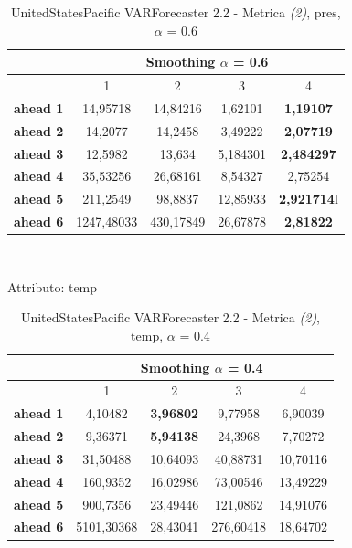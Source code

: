\documentclass[12pt,a4paper,oneside,openright]{book}
\begin{document}
\medskip

\begin{table}[H]
\centering
\begin{tabular}{|c|c|c|c|c|}
\hline
 & \multicolumn{4}{|c|}{Smoothing $\alpha$ = 0.6} \\
\hline
& 1 & 2 & 3 & 4 \\
\hline
\textbf{ahead 1} & 14,95718 & 14,84216 & 1,62101 & \textbf{1,19107} \\
\hline
\textbf{ahead 2} & 14,2077 & 14,2458 & 3,49222 & \textbf{2,07719}\\ 
\hline
\textbf{ahead 3} & 12,5982 & 13,634 & 5,184301 & \textbf{2,484297} \\
\hline
\textbf{ahead 4} & 35,53256 & 26,68161 & 8,54327 & 2,75254\\ 
\hline
\textbf{ahead 5} & 211,2549 & 98,8837 & 12,85933 & \textbf{2,921714}l\\
\hline
\textbf{ahead 6} & 1247,48033 & 430,17849 & 26,67878 & \textbf{2,81822}\\ 
\hline	
\end{tabular} \\
\caption{UnitedStatesPacific VARForecaster 2.2 - Metrica \textit{(2)}, pres, $\alpha$ = 0.6}
\end{table}

\medskip

Attributo: temp \\ 

\begin{table}[H]
\centering
\begin{tabular}{|c|c|c|c|c|}
\hline
 & \multicolumn{4}{|c|}{Smoothing $\alpha$ = 0.4} \\
\hline
& 1 & 2 & 3 & 4 \\
\hline
\textbf{ahead 1} & 4,10482 & \textbf{3,96802} & 9,77958 & 6,90039\\
\hline
\textbf{ahead 2} & 9,36371 & \textbf{5,94138} & 24,3968 & 7,70272\\ 
\hline
\textbf{ahead 3} & 31,50488 & 10,64093 & 40,88731 & 10,70116\\
\hline
\textbf{ahead 4} & 160,9352 & 16,02986 & 73,00546 & 13,49229\\ 
\hline
\textbf{ahead 5} & 900,7356 & 23,49446 & 121,0862 & 14,91076\\
\hline
\textbf{ahead 6} & 5101,30368 & 28,43041 & 276,60418 & 18,64702\\ 
\hline
\end{tabular} \\
\caption{UnitedStatesPacific VARForecaster 2.2 - Metrica \textit{(2)}, temp, $\alpha$ = 0.4}
\end{table}
\end{document}
